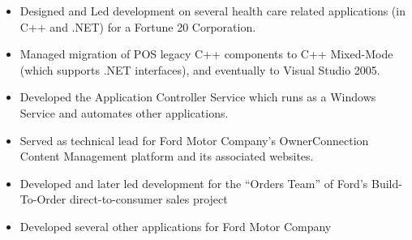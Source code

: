 \documentclass[12pt,letterpaper,sans]{moderncv}
\begin{document}
    \begin{itemize}[leftmargin=1.24in]
        \item Designed and Led development on several health care related applications (in C++ and .NET) for a Fortune 20 Corporation.
        \item Managed migration of POS legacy C++ components to C++ Mixed-Mode (which supports .NET interfaces), and eventually to Visual Studio 2005.
        \item Developed the Application Controller Service which runs as a Windows Service and automates other applications.
    \end{itemize}
    \begin{itemize}[leftmargin=1.24in]
        \item Served as technical lead for Ford Motor Company's OwnerConnection Content Management platform and its associated websites.  
        \item Developed and later led development for the ``Orders Team'' of Ford's Build-To-Order direct-to-consumer sales project
        \item Developed several other applications for Ford Motor Company
    \end{itemize}
\end{document}
